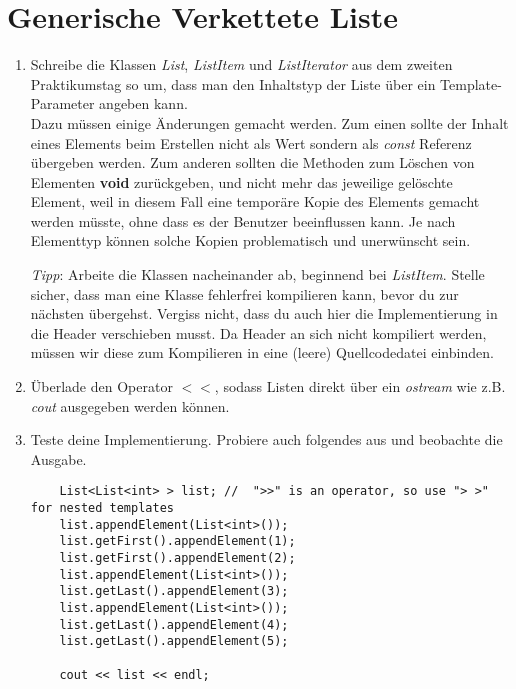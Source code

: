 \documentclass[
  accentcolor=tud1c,	%
  colorbacktitle,		%
  inverttitle,			%
  german,				%
  twoside
]{tudexercise}
\begin{document}
\section{Generische Verkettete Liste}
\label{sec:list}
\begin{enumerate}
\item 
Schreibe die Klassen \emph{List}, \emph{ListItem} und \emph{ListIterator} aus dem zweiten Praktikumstag so um, dass man den Inhaltstyp der Liste über ein Template-Parameter angeben kann.\\

Dazu müssen einige Änderungen gemacht werden.
Zum einen sollte der Inhalt eines Elements beim Erstellen nicht als Wert sondern als \emph{const} Referenz übergeben werden.
Zum anderen sollten die Methoden zum Löschen von Elementen \textbf{void} zurückgeben, und nicht mehr das jeweilige gelöschte Element, weil in diesem Fall eine temporäre Kopie des Elements gemacht werden müsste, ohne dass es der Benutzer beeinflussen kann.
Je nach Elementtyp können solche Kopien problematisch und unerwünscht sein.

\emph{Tipp}: Arbeite die Klassen nacheinander ab, beginnend bei \emph{ListItem}.
Stelle sicher, dass man eine Klasse fehlerfrei kompilieren kann, bevor du zur nächsten übergehst.
Vergiss nicht, dass du auch hier die Implementierung in die Header verschieben musst.
Da Header an sich nicht kompiliert werden, müssen wir diese zum Kompilieren in eine (leere) Quellcodedatei einbinden.\\

\item
Überlade den Operator $<<$, sodass Listen direkt über ein \emph{ostream} wie z.B. \emph{cout} ausgegeben werden können. 

\item Teste deine Implementierung. Probiere auch folgendes aus und beobachte die Ausgabe.

\begin{lstlisting}
	List<List<int> > list; //  ">>" is an operator, so use "> >" for nested templates
	list.appendElement(List<int>());
	list.getFirst().appendElement(1);
	list.getFirst().appendElement(2);
	list.appendElement(List<int>());
	list.getLast().appendElement(3);
	list.appendElement(List<int>());
	list.getLast().appendElement(4);
	list.getLast().appendElement(5);
	
	cout << list << endl;
\end{lstlisting}
\end{enumerate}
\end{document}
